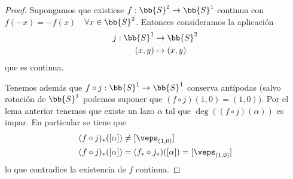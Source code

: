 \begin{lema}
\begin{proof}
        Supongamos que existiese $f:\bb{S}^2 \to \bb{S}^1$ continua con $f(-x) = -f(x)$\ \ $\forall x \in \bb{S}^2$. Entonces consideramos la aplicación 
        \begin{align*}
            j: \bb{S}^1 & \to \bb{S}^2\\
            (x,y) & \mapsto (x,y)
        \end{align*}
        que es continua. 
        
        \begin{figure}[H]
            \centering
        \end{figure}
        
        Tenemos además que $f\circ j : \bb{S}^1 \to \bb{S}^1$ conserva antípodas (salvo rotación de $\bb{S}^1$ podemos suponer que $(f\circ j)(1,0)=(1,0)$). Por el lema anterior tenemos que existe un lazo $\alpha$ tal que $\deg((f\circ j)(\alpha))$ es impar. En particular se tiene que 
        \begin{align*}
            (f\circ j)_*([\alpha]) &\neq [\veps_{(1,0)}]\\
            (f\circ j)_*([\alpha]) &= (f_* \circ j_*)([\alpha]) = [\veps_{(1,0)}]
        \end{align*}
        lo que contradice la existencia de $f$ continua.
    \end{proof}
\end{lema}

